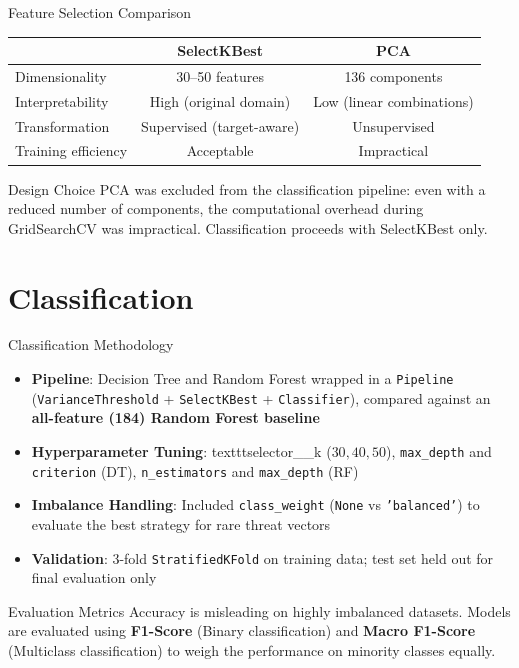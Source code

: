 \documentclass{beamer}
\begin{document}
\begin{frame}{Feature Selection Comparison}
    \small
    \begin{tabular}{lcc}
      \toprule
       & \textbf{SelectKBest} & \textbf{PCA} \\
      \midrule
      Dimensionality & 30--50 features & 136 components \\
      Interpretability & High (original domain) & Low (linear combinations) \\
      Transformation & Supervised (target-aware) & Unsupervised \\
      Training efficiency & Acceptable & Impractical \\
      \bottomrule
    \end{tabular}
  \vspace{0.3cm}
  \begin{alertblock}{Design Choice}
    PCA was excluded from the classification pipeline: even with a reduced number of
    components, the computational overhead during GridSearchCV was impractical. Classification
    proceeds with SelectKBest only.
  \end{alertblock}
\end{frame}

\section{Classification}

\begin{frame}{Classification Methodology}
  \begin{itemize}
    \item \textbf{Pipeline}: Decision Tree and Random Forest wrapped in a \texttt{Pipeline} (\texttt{VarianceThreshold} + \texttt{SelectKBest} + \texttt{Classifier}), compared against an \textbf{all-feature (184) Random Forest baseline}
    \item \textbf{Hyperparameter Tuning}: texttt{selector\_\_k} ($30, 40, 50$), \texttt{max\_depth} and \texttt{criterion} (DT), \texttt{n\_estimators} and \texttt{max\_depth} (RF)
    \item \textbf{Imbalance Handling}: Included \texttt{class\_weight} (\texttt{None} vs \texttt{'balanced'}) to evaluate the best strategy for rare threat vectors
    \item \textbf{Validation}: 3-fold \texttt{StratifiedKFold} on training data; test set held out for final evaluation only 
  \end{itemize}
  \begin{block}{Evaluation Metrics}
    Accuracy is misleading on highly imbalanced datasets. Models are evaluated 
    using \textbf{F1-Score} (Binary classification) and \textbf{Macro F1-Score} 
    (Multiclass classification) to weigh the performance on minority classes equally.
  \end{block}
\end{frame}
\end{document}
